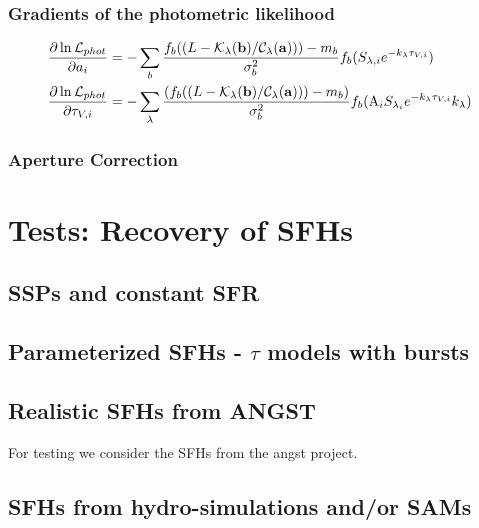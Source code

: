 \documentclass{emulateapj}
\begin{document}
\subsubsection{Gradients of the photometric likelihood}

\begin{equation}
\begin{split}
&\frac{\partial \ln\mathcal{L}_{phot}}{\partial a_i} = -\sum\limits_b  \frac{f_b((L-\mathcal{K}_\lambda({\bf b})/\mathcal{C}_\lambda({\bf a})))- m_b}{\sigma_b^2} f_b(S_{\lambda,i} e^{-k_\lambda\tau_{V,i}}) \\
&\frac{\partial \ln\mathcal{L}_{phot}}{\partial \tau_{V,i}} = -\sum\limits_\lambda  \frac{(f_b((L-\mathcal{K}_\lambda({\bf b})/\mathcal{C}_\lambda({\bf a})))- m_b)}{\sigma_b^2} f_b(\text{A}_iS_{\lambda_i} e^{-k_\lambda\tau_{V,i}} k_\lambda) \\
\end{split}
\end{equation}



\subsubsection{Aperture Correction}


\section{Tests: Recovery of SFHs}

\subsection{SSPs and constant SFR}

\subsection{Parameterized SFHs - $\tau$ models with bursts}

\subsection{Realistic SFHs from ANGST}
For testing we consider the SFHs from the angst project. 

\subsection{SFHs from hydro-simulations and/or SAMs}
\end{document}
